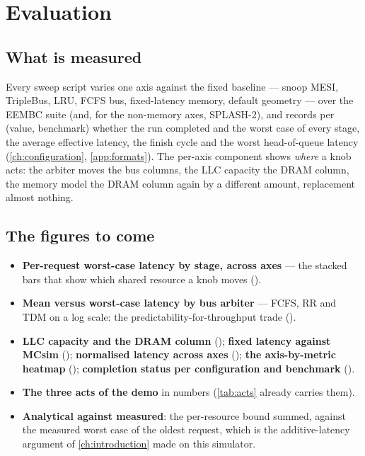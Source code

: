 \chapter{Evaluation}\label{ch:evaluation}


\section{What is measured}

Every sweep script varies one axis against the fixed baseline --- snoop MESI, TripleBus, LRU,
FCFS bus, fixed-latency memory, default geometry --- over the EEMBC suite (and, for the
non-memory axes, SPLASH-2), and records per (value, benchmark) whether the run completed and the
worst case of every stage, the average effective latency, the finish cycle and the worst
head-of-queue latency (\cref{ch:configuration}, \cref{app:formats}). The per-axis component
shows \emph{where} a knob acts: the arbiter moves the bus columns, the LLC capacity the DRAM
column, the memory model the DRAM column again by a different amount, replacement almost
nothing.

\section{The figures to come}

\begin{itemize}
\item \textbf{Per-request worst-case latency by stage, across axes} --- the stacked bars that
  show which shared resource a knob moves ().
\item \textbf{Mean versus worst-case latency by bus arbiter} --- FCFS, RR and TDM on a log
  scale: the predictability-for-throughput trade ().
\item \textbf{LLC capacity and the DRAM column} (); \textbf{fixed
  latency against MCsim} (); \textbf{normalised latency across axes}
  (); \textbf{the axis-by-metric heatmap} ();
  \textbf{completion status per configuration and benchmark} ().
\item \textbf{The three acts of the demo} in numbers (\cref{tab:acts} already carries them).
\item \textbf{Analytical against measured}: the per-resource bound summed, against the measured
  worst case of the oldest request, which is the additive-latency argument of
  \cref{ch:introduction} made on this simulator.
\end{itemize}

